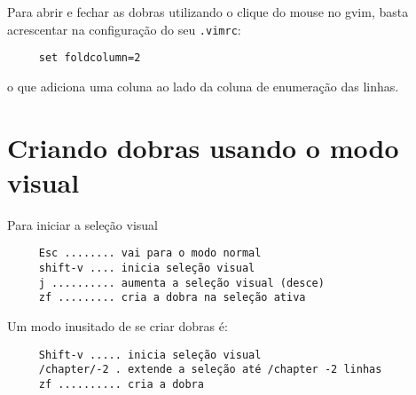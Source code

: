 Para abrir e fechar as dobras utilizando o clique do mouse no gvim, basta
acrescentar na configuração do seu \verb|.vimrc|:
\begin{verbatim}
     set foldcolumn=2
\end{verbatim}
o que adiciona uma coluna ao lado da coluna de enumeração das linhas.

\section{Criando dobras usando o modo visual}
\label{Criando folders usando o modo visual}
Para iniciar a seleção visual
\begin{verbatim}
     Esc ........ vai para o modo normal
     shift-v .... inicia seleção visual
     j .......... aumenta a seleção visual (desce)
     zf ......... cria a dobra na seleção ativa
\end{verbatim}

Um modo inusitado de se criar dobras é:
\begin{verbatim}
     Shift-v ..... inicia seleção visual
     /chapter/-2 . extende a seleção até /chapter -2 linhas
     zf .......... cria a dobra
\end{verbatim}

